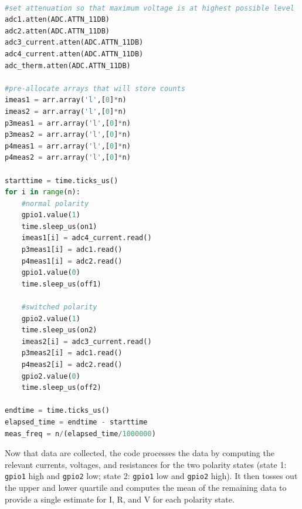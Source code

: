 \begin{lstlisting}[language=Python]

#set attenuation so that maximum voltage is at highest possible level
adc1.atten(ADC.ATTN_11DB)
adc2.atten(ADC.ATTN_11DB)
adc3_current.atten(ADC.ATTN_11DB)
adc4_current.atten(ADC.ATTN_11DB)
adc_therm.atten(ADC.ATTN_11DB)

#pre-allocate arrays that will store counts
imeas1 = arr.array('l',[0]*n)
imeas2 = arr.array('l',[0]*n)
p3meas1 = arr.array('l',[0]*n)
p3meas2 = arr.array('l',[0]*n)
p4meas1 = arr.array('l',[0]*n)
p4meas2 = arr.array('l',[0]*n)

starttime = time.ticks_us()
for i in range(n):
    #normal polarity
    gpio1.value(1)
    time.sleep_us(on1)
    imeas1[i] = adc4_current.read()
    p3meas1[i] = adc1.read()
    p4meas1[i] = adc2.read()
    gpio1.value(0)
    time.sleep_us(off1)
    
    #switched polarity
    gpio2.value(1)
    time.sleep_us(on2)
    imeas2[i] = adc3_current.read()
    p3meas2[i] = adc1.read()
    p4meas2[i] = adc2.read()
    gpio2.value(0)
    time.sleep_us(off2)
 
endtime = time.ticks_us()
elapsed_time = endtime - starttime
meas_freq = n/(elapsed_time/1000000)

\end{lstlisting}

Now that data are collected, the code processes the data by computing the relevant currents, voltages, and resistances for the two polarity states (state 1: \texttt{gpio1} high and \texttt{gpio2} low; state 2: \texttt{gpio1} low and \texttt{gpio2} high). It then tosses out the upper and lower quartile and computes the mean of the remaining data to provide a single estimate for I, R, and V for each polarity state.  

